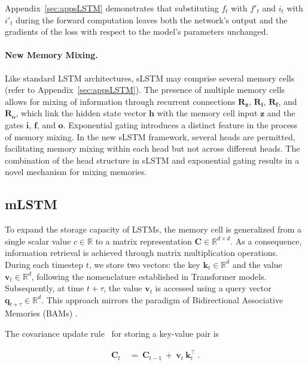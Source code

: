 Appendix~\ref{sec:appsLSTM} demonstrates that substituting $f_t$ with $f'_t$ and $i_t$ with $i'_t$ during the forward computation leaves both the network’s output and the gradients of the loss with respect to the model’s parameters unchanged.

\paragraph{New Memory Mixing.} Like standard LSTM architectures, sLSTM may comprise several memory cells (refer to Appendix~\ref{sec:appsLSTM}). The presence of multiple memory cells allows for mixing of information through recurrent connections $\mathbf{R}_{\mathbf{z}}$, $\mathbf{R}_{\mathbf{i}}$, $\mathbf{R}_{\mathbf{f}}$, and $\mathbf{R}_{\mathbf{o}}$, which link the hidden state vector $\mathbf{h}$ with the memory cell input $\mathbf{z}$ and the gates $\mathbf{i}$, $\mathbf{f}$, and $\mathbf{o}$. Exponential gating introduces a distinct feature in the process of memory mixing. In the new sLSTM framework, several heads are permitted, facilitating memory mixing within each head but not across different heads. The combination of the head structure in sLSTM and exponential gating results in a novel mechanism for mixing memories.

\subsection{mLSTM}
\label{sec:mLSTM}

To expand the storage capacity of LSTMs, the memory cell is generalized from a single scalar value $c \in \mathbb{R}$ to a matrix representation $\mathbf{C} \in \mathbb{R}^{d \times d}$. As a consequence, information retrieval is achieved through matrix multiplication operations. During each timestep $t$, we store two vectors: the key $\mathbf{k}_t \in \mathbb{R}^d$ and the value $\mathbf{v}_t \in \mathbb{R}^d$, following the nomenclature established in Transformer models. Subsequently, at time $t + \tau$, the value $\mathbf{v}_t$ is accessed using a query vector $\mathbf{q}_{t+\tau} \in \mathbb{R}^d$. This approach mirrors the paradigm of Bidirectional Associative Memories (BAMs) \citep{Kohonen:72,Anderson:72,Nakano:72,Anderson:77}.

The covariance update rule~\citep{Sejnowski:77,Dayan:91} for storing a key-value pair is

\begin{align}
\mathbf{C}_t \ &= \ \mathbf{C}_{t-1} \ + \ \mathbf{v}_{t} \ \mathbf{k}_t^\top \ .
\end{align}

